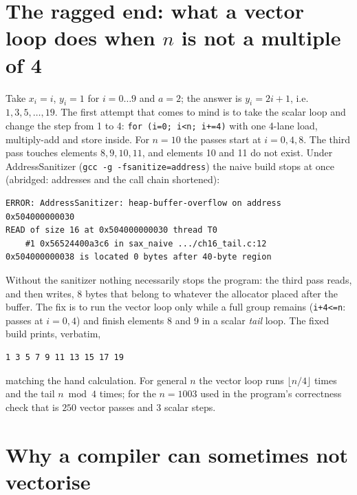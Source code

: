 \section{The ragged end: what a vector loop does when $n$ is not a multiple of 4}




\begin{example}
Take $x_i=i$, $y_i=1$ for $i=0\dots9$ and $a=2$; the answer is
$y_i=2i+1$, i.e.\ $1,3,5,\dots,19$. The first attempt that comes to
mind is to take the scalar loop and change the step from 1 to 4:
\texttt{for (i=0; i<n; i+=4)} with one 4-lane load, multiply-add and
store inside. For $n=10$ the passes start at $i=0,4,8$. The third
pass touches elements $8,9,10,11$, and elements 10 and 11 do not
exist. Under AddressSanitizer (\texttt{gcc -g -fsanitize=address})
the naive build stops at once (abridged: addresses and the call chain shortened):

{\scriptsize
\begin{verbatim}
ERROR: AddressSanitizer: heap-buffer-overflow on address 0x504000000030
READ of size 16 at 0x504000000030 thread T0
    #1 0x56524400a3c6 in sax_naive .../ch16_tail.c:12
0x504000000038 is located 0 bytes after 40-byte region
\end{verbatim}
}
Without the sanitizer nothing necessarily stops the program: the
third pass reads, and then writes, 8 bytes that belong to whatever
the allocator placed after the buffer. The fix
is to run the vector loop only while a full group remains
(\texttt{i+4<=n}: passes at $i=0,4$) and finish elements 8 and 9 in a
scalar \emph{tail} loop. The fixed build prints, verbatim,
\begin{verbatim}
1 3 5 7 9 11 13 15 17 19
\end{verbatim}
matching the hand calculation. For general $n$ the vector loop runs
$\lfloor n/4\rfloor$ times and the tail $n \bmod 4$ times; for the
$n=1003$ used in the program's correctness check that is $250$ vector
passes and $3$ scalar steps.
\end{example}

\section{Why a compiler can sometimes not vectorise}

